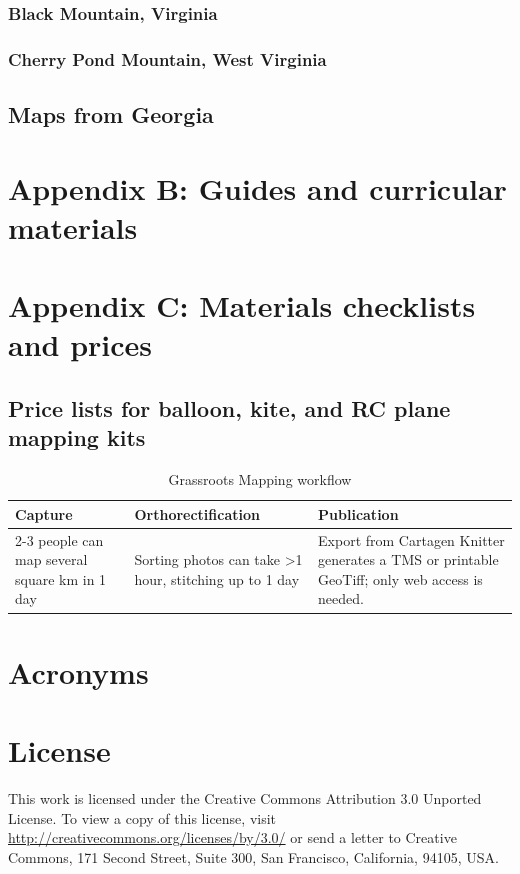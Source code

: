 \documentclass[11pt]{report}
\newcommand{\otoprule}{\midrule[\heavyrulewidth]}
\begin{document}
\subsection{Black Mountain, Virginia}

\subsection{Cherry Pond Mountain, West Virginia}

\section{Maps from Georgia}


\chapter*{Appendix B: Guides and curricular materials}


\chapter*{Appendix C: Materials checklists and prices}

\section{Price lists for balloon, kite, and RC plane mapping kits}

\begin{table}[tp] 
\caption{Grassroots Mapping workflow}
\centering %
\renewcommand{\arraystretch}{1.4}
\begin{tabularx}{\textwidth}{YYY}
\toprule
Capture&Orthorectification&Publication\\\otoprule
2-3 people can map several square km in 1 day&Sorting photos can take \textgreater1 hour, stitching up to 1 day&Export from Cartagen Knitter generates a TMS or printable GeoTiff; only web access is needed.\\\bottomrule 
\end{tabularx}
\end{table}

\nocite{*}
{\small


}

\chapter*{Acronyms}

\begin{acronym}
\end{acronym}

\chapter*{License}

This work is licensed under the Creative Commons Attribution 3.0 Unported License. To view a copy of this license, visit \url{http://creativecommons.org/licenses/by/3.0/} or send a letter to Creative Commons, 171 Second Street, Suite 300, San Francisco, California, 94105, USA.
\end{document}
